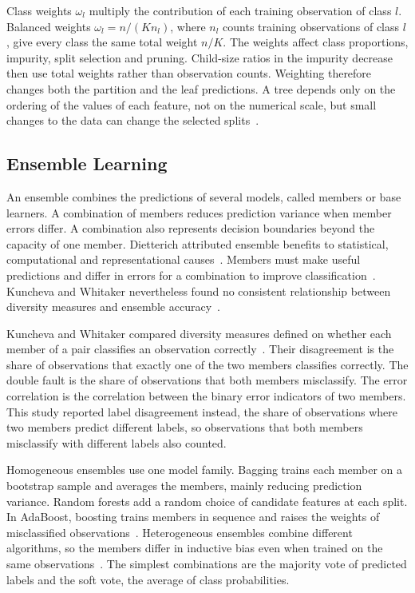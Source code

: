 \documentclass[conference]{IEEEtran}
\begin{document}
Class weights $\omega_l$ multiply the contribution of each training observation of class $l$. Balanced weights $\omega_l = n/(K n_l)$, where $n_l$ counts training observations of class $l$, give every class the same total weight $n/K$. The weights affect class proportions, impurity, split selection and pruning. Child-size ratios in the impurity decrease then use total weights rather than observation counts. Weighting therefore changes both the partition and the leaf predictions. A tree depends only on the ordering of the values of each feature, not on the numerical scale, but small changes to the data can change the selected splits~\cite{hastie2009}.

\subsection{Ensemble Learning}
An ensemble combines the predictions of several models, called members or base learners. A combination of members reduces prediction variance when member errors differ. A combination also represents decision boundaries beyond the capacity of one member. Dietterich attributed ensemble benefits to statistical, computational and representational causes~\cite{dietterich2000}. Members must make useful predictions and differ in errors for a combination to improve classification~\cite{dietterich2000}. Kuncheva and Whitaker nevertheless found no consistent relationship between diversity measures and ensemble accuracy~\cite{kuncheva2003}.

Kuncheva and Whitaker compared diversity measures defined on whether each member of a pair classifies an observation correctly~\cite{kuncheva2003}. Their disagreement is the share of observations that exactly one of the two members classifies correctly. The double fault is the share of observations that both members misclassify. The error correlation is the correlation between the binary error indicators of two members. This study reported label disagreement instead, the share of observations where two members predict different labels, so observations that both members misclassify with different labels also counted.

Homogeneous ensembles use one model family. Bagging trains each member on a bootstrap sample and averages the members, mainly reducing prediction variance. Random forests add a random choice of candidate features at each split. In AdaBoost, boosting trains members in sequence and raises the weights of misclassified observations~\cite{hastie2009}. Heterogeneous ensembles combine different algorithms, so the members differ in inductive bias even when trained on the same observations~\cite{wolpert1992}. The simplest combinations are the majority vote of predicted labels and the soft vote, the average of class probabilities.
\end{document}
